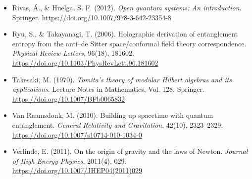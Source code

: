 \documentclass[12pt,a4paper]{article}
\numberwithin{equation}{section}
\begin{document}
\begin{itemize}[leftmargin=0.5in, itemindent=-0.5in, label={}]
\item Rivas, Á., \& Huelga, S. F. (2012). \textit{Open quantum systems: An introduction}. Springer. \url{https://doi.org/10.1007/978-3-642-23354-8}

\item Ryu, S., \& Takayanagi, T. (2006). Holographic derivation of entanglement entropy from the anti--de Sitter space/conformal field theory correspondence. \textit{Physical Review Letters}, 96(18), 181602. \url{https://doi.org/10.1103/PhysRevLett.96.181602}

\item Takesaki, M. (1970). \textit{Tomita's theory of modular Hilbert algebras and its applications}. Lecture Notes in Mathematics, Vol. 128. Springer. \url{https://doi.org/10.1007/BFb0065832}

\item Van Raamsdonk, M. (2010). Building up spacetime with quantum entanglement. \textit{General Relativity and Gravitation}, 42(10), 2323--2329. \url{https://doi.org/10.1007/s10714-010-1034-0}

\item Verlinde, E. (2011). On the origin of gravity and the laws of Newton. \textit{Journal of High Energy Physics}, 2011(4), 029. \url{https://doi.org/10.1007/JHEP04(2011)029}

\end{itemize}
\end{document}
